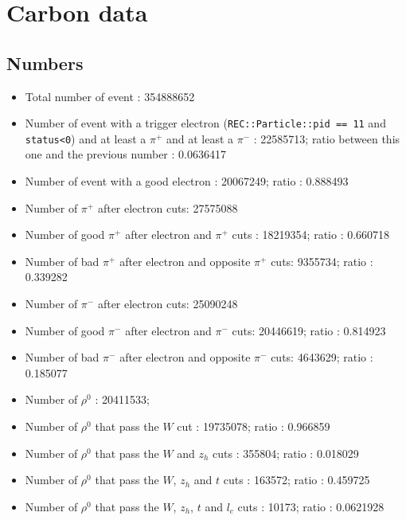 \documentclass{report}
\begin{document}
    \section{Carbon data}
    \subsection{Numbers}
    
    \begin{itemize}
        \item Total number of event : 354888652
        \item Number of event with a trigger electron (\texttt{REC::Particle::pid == 11} and \texttt{status<0}) and at least a \(\pi^+\) and at least a \(\pi^-\) : 22585713; ratio between this one and the previous number : 0.0636417
        \item Number of event with a good electron : 20067249; ratio : 0.888493
        \item Number of \(\pi^+\) after electron cuts: 27575088
        \item Number of good \(\pi^+\) after electron and \(\pi^+\) cuts : 18219354; ratio : 0.660718
        \item Number of bad \(\pi^+\) after electron and opposite \(\pi^+\) cuts: 9355734; ratio : 0.339282
        \item Number of \(\pi^-\) after electron cuts: 25090248
        \item Number of good \(\pi^-\) after electron and \(\pi^-\) cuts: 20446619; ratio : 0.814923
        \item Number of bad \(\pi^-\) after electron and opposite \(\pi^-\) cuts: 4643629; ratio : 0.185077
        \item Number of \(\rho^0\) : 20411533;
        \item Number of \(\rho^0\) that pass the \(W\) cut : 19735078; ratio : 0.966859
        \item Number of \(\rho^0\) that pass the \(W\) and \(z_h\) cuts : 355804; ratio : 0.018029
        \item Number of \(\rho^0\) that pass the \(W\), \(z_h\) and \(t\) cuts : 163572; ratio : 0.459725
        \item Number of \(\rho^0\) that pass the \(W\), \(z_h\), \(t\) and \(l_c\) cuts : 10173; ratio : 0.0621928
    \end{itemize}
    

    

    
\end{document}
